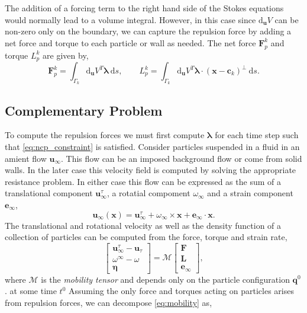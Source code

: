 \documentclass[preprint, 10pt]{elsarticle}
\begin{document}
The addition of a forcing term to the right hand side of the Stokes equations would normally lead to a volume integral. However, in this case since $\text{d}_{\mathbf{u}} V$ can be non-zero only on the boundary, we can capture the repulsion force by adding a net force and torque to each particle or wall as needed. The net force $\mathbf{F}^k_p$ and torque $L^k_p$ are given by,
\[ \mathbf{F}^k_p = \int_{\Gamma_k} \text{d}_\mathbf{u}V^T\pmb{\lambda}~\text{d}s, \qquad L_p^k = \int_{\Gamma_k}  \text{d}_\mathbf{u}V^T\pmb{\lambda}\cdot(\mathbf{x}-\mathbf{c}_k)^\perp~\text{d}s.\]

\subsection{Complementary Problem}

To compute the repulsion forces we must first compute $\pmb{\lambda}$ for each time step such that \eqref{eq:ncp_constraint} is satisfied.
Consider particles suspended in a fluid in an amient flow $\mathbf{u}_\infty$. This flow can be an imposed background flow or come from solid walls. In the later case this velocity field is computed by solving the appropriate resistance problem. In either case this flow can be expressed as the sum of a translational component $\mathbf{u}_{\infty}^\tau$, a rotatial compoment $\omega_{\infty}$ and a strain component $\mathbf{e}_{\infty}$,
\[ \mathbf{u}_{\infty}(\mathbf{x}) =   \mathbf{u}_{\infty}^\tau + \omega_\infty\times \mathbf{x} + \mathbf{e}_\infty \cdot\mathbf{x}.\]
The translational and rotational velocity as well as the density function of a collection of particles can be computed from the force, torque and strain rate\cite{Karrila1991},
\begin{equation}\label{eq:mobility} \begin{bmatrix} \mathbf{u}_\infty^\tau - \mathbf{u}_\tau\\ \omega^\infty - \omega \\\pmb{\eta}\end{bmatrix} = \mathcal{M}\begin{bmatrix}\mathbf{F}\\\mathbf{L}\\\mathbf{e}_\infty\end{bmatrix},\end{equation}
where $\mathcal{M}$ is the \textit{mobility tensor} and depends only on the particle configuration $\mathbf{q}^0$. at some time $t^0$ Assuming the only force and torques acting on particles arises from repulsion forces, we can decompose \eqref{eq:mobility} as,
\end{document}
